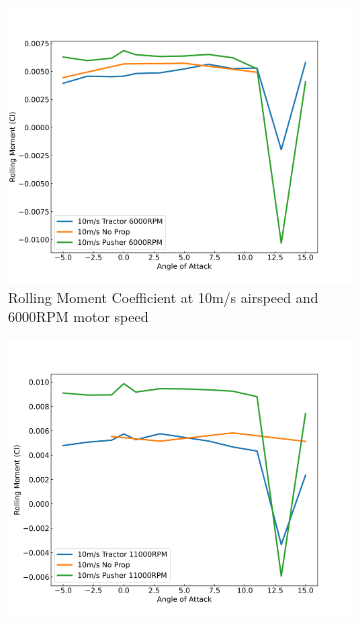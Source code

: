 \begin{figure}[H]
    \centering
    \begin{subfigure}[b]{0.467\textwidth}
        \centering
        \includegraphics[width=\textwidth]{05_Results/Figs/Cl_roll/10ms_6000RPM_Cl_roll.png}
        \caption{Rolling Moment Coefficient at 10m/s airspeed and 6000RPM motor speed}
        \label{fig:Cl_roll_10ms_6000}
    \end{subfigure}
    \begin{subfigure}[b]{0.467\textwidth}
        \centering
        \includegraphics[width=\textwidth]{05_Results/Figs/Cl_roll/10ms_11000RPM_Cl.png}

\end{subfigure}
\end{figure}
